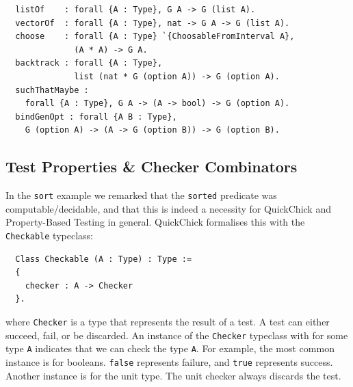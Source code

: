 \documentclass[twoside,11pt,openright]{report}
\newenvironment{code}{\captionsetup{type=figure, singlelinecheck=off, justification=raggedleft}}{}
\newcommand{\pbt}{Property-Based Testing}
\newcommand{\coq}[1]{\texttt{#1}}
\begin{document}
\begin{code}
\label{def:listof-vectorof-choose-backtrack-stmaybe-bindgenopt}
\begin{verbatim}
  listOf    : forall {A : Type}, G A -> G (list A).
  vectorOf  : forall {A : Type}, nat -> G A -> G (list A).
  choose    : forall {A : Type} `{ChoosableFromInterval A},
              (A * A) -> G A.
  backtrack : forall {A : Type}, 
              list (nat * G (option A)) -> G (option A).
  suchThatMaybe :
    forall {A : Type}, G A -> (A -> bool) -> G (option A).
  bindGenOpt : forall {A B : Type},
    G (option A) -> (A -> G (option B)) -> G (option B).
\end{verbatim}
\end{code}

\subsection{Test Properties \& Checker Combinators}
In the \coq{sort} example we remarked that the \coq{sorted} predicate was computable/decidable, and that this is indeed a necessity for QuickChick and \pbt{} in general. QuickChick formalises this with the \coq{Checkable} typeclass:
\begin{code}
\label{def:checkable}
\begin{verbatim}
  Class Checkable (A : Type) : Type :=
  {
    checker : A -> Checker
  }.
\end{verbatim}
\end{code}
where \coq{Checker} is a type that represents the result of a test. A test can either succeed, fail, or be discarded. An instance of the \coq{Checker} typeclass with for some type \coq{A} indicates that we can check the type \coq{A}. For example, the most common instance is for booleans. \coq{false} represents failure, and \coq{true} represents success. Another instance is for the unit type. The unit checker always discards the test.
\end{document}
